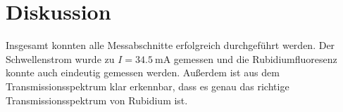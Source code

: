 \section{Diskussion}
\label{sec:Diskussion}
Insgesamt konnten alle Messabschnitte erfolgreich durchgeführt werden. Der Schwellenstrom wurde zu
$I=\SI{34,5}{\milli\ampere}$ gemessen und die Rubidiumfluoresenz konnte auch eindeutig gemessen werden.
Außerdem ist aus dem Transmissionsspektrum klar erkennbar, dass es genau das richtige Transmissionsspektrum
von Rubidium ist.